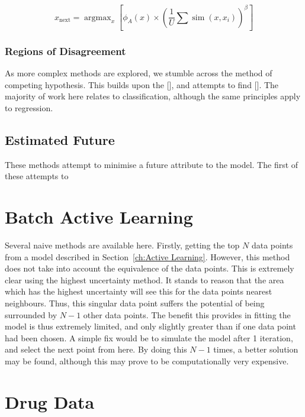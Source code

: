 \documentclass[a4paper, english]{article}
\DeclareMathOperator*{\argmax}{argmax}
\DeclareMathOperator*{\simm}{sim}
\begin{document}
\begin{equation}
    \label{eq:Settles_denisty}
    x_\mathrm{next}=\argmax_x{\left[\phi_A(x)\times{\left(\frac{1}{U}\sum{\simm{(x, x_i)}}\right)}^\beta\right]}
\end{equation}

\subsubsection{Regions of Disagreement}
As more complex methods are explored, we stumble across the method of competing hypothesis. This builds upon the [], and attempts to find []. The majority of work here relates to classification, although the same principles apply to regression.

\subsection{Estimated Future}
These methods attempt to minimise a future attribute to the model. The first of these attempts to
\section{Batch Active Learning}
Several naive methods are available here. Firstly, getting the top $N$ data points from a model described in Section~\ref{ch:Active Learning}. However, this method does not take into account the equivalence of the data points. This is extremely clear using the highest uncertainty method. It stands to reason that the area which has the highest uncertainty will see this for the data points nearest neighbours. Thus, this singular data point suffers the potential of being surrounded by $N-1$ other data points. The benefit this provides in fitting the model is thus extremely limited, and only slightly greater than if one data point had been chosen. A simple fix would be to simulate the model after 1 iteration, and select the next point from here. By doing this $N-1$ times, a better solution may be found, although this may prove to be computationally very expensive.
\section{Drug Data}
\blindtext[2]{}

\printbibliography{}
\appendix
\end{document}
